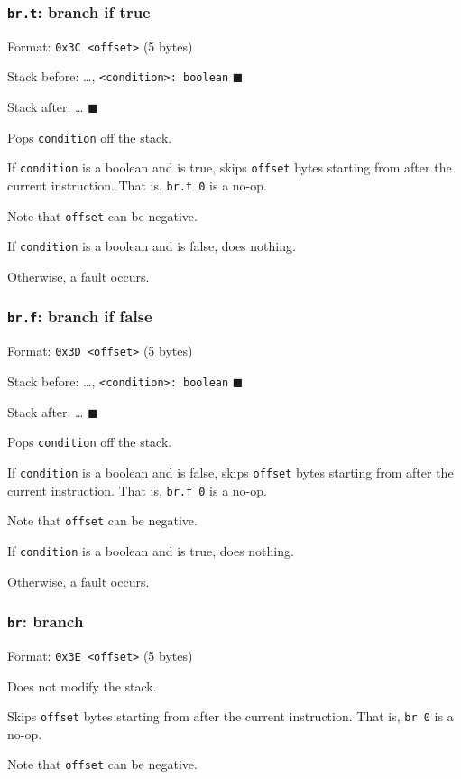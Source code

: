 \subsubsection{\texttt{br.t}: branch if true}
\label{sec:orge20199f}
Format: \texttt{0x3C <offset>} (5 bytes)

Stack before: \ldots{}, \texttt{<condition>: boolean} \(\blacksquare\)

Stack after: \ldots{} \(\blacksquare\)

Pops \texttt{condition} off the stack.

If \texttt{condition} is a boolean and is true, skips \texttt{offset} bytes starting
from after the current instruction. That is, \texttt{br.t 0} is a no-op.

Note that \texttt{offset} can be negative.

If \texttt{condition} is a boolean and is false, does nothing.

Otherwise, a fault occurs.

\subsubsection{\texttt{br.f}: branch if false}
\label{sec:org6c72b12}
Format: \texttt{0x3D <offset>} (5 bytes)

Stack before: \ldots{}, \texttt{<condition>: boolean} \(\blacksquare\)

Stack after: \ldots{} \(\blacksquare\)

Pops \texttt{condition} off the stack.

If \texttt{condition} is a boolean and is false, skips \texttt{offset} bytes starting
from after the current instruction. That is, \texttt{br.f 0} is a no-op.

Note that \texttt{offset} can be negative.

If \texttt{condition} is a boolean and is true, does nothing.

Otherwise, a fault occurs.

\subsubsection{\texttt{br}: branch}
\label{sec:org71bb9a3}
Format: \texttt{0x3E <offset>} (5 bytes)

Does not modify the stack.

Skips \texttt{offset} bytes starting from after the current instruction. That
is, \texttt{br 0} is a no-op.

Note that \texttt{offset} can be negative.


